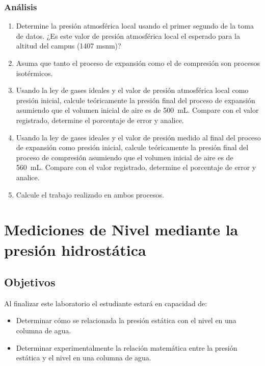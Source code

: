 \documentclass[12pt,letterpaper]{report}
\newcommand{\obj}{Objetivos}
\newcommand{\capacidad}{Al finalizar este laboratorio el estudiante estará en capacidad de:}
\begin{document}
\subsection{Análisis}
\begin{enumerate}
    \item Determine la presión atmosférica local usando el primer segundo de la toma de datos. ¿Es este valor de presión atmosférica local el esperado para la altitud del campus (1407 msnm)?
    \item Asuma que tanto el proceso de expansión como el de compresión son procesos isotérmicos. 
    \item Usando la ley de gases ideales y el valor de presión atmosférica local como presión inicial, calcule teóricamente la presión final del proceso de expansión asumiendo que el volumen inicial de aire es de \SI{500}{\milli\liter}. Compare con el valor registrado, determine el porcentaje de error y analice.
    \item Usando la ley de gases ideales y el valor de presión medido al final del proceso de expansión como presión inicial, calcule teóricamente la presión final del proceso de compresión asumiendo que el volumen inicial de aire es de \SI{560}{\milli\liter}. Compare con el valor registrado, determine el porcentaje de error y analice.
    \item Calcule el trabajo realizado en ambos procesos.
\end{enumerate}




\chapter{Mediciones de Nivel mediante la presión hidrostática}
\section{\obj}
\capacidad
\begin{itemize}
\item Determinar cómo se relacionada la presión estática con el nivel en una
columna de agua.
\item Determinar experimentalmente la relación matemática entre la presión
estática y el nivel en una columna de agua.
\end{itemize}
\end{document}
